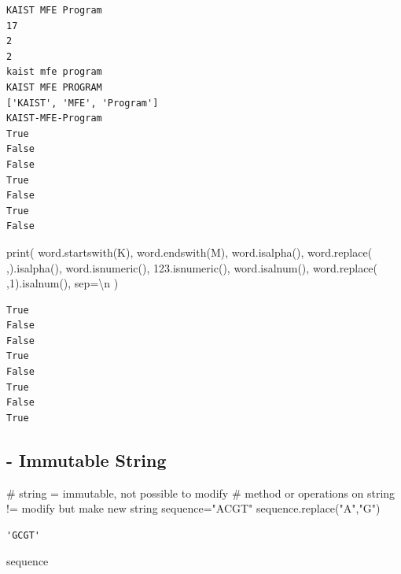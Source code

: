 \documentclass[
  a4paper,
  DIV=11,
  numbers=noendperiod]{scrreprt}
\newenvironment{Shaded}{\begin{snugshade}}{\end{snugshade}}
\newcommand{\BuiltInTok}[1]{\textcolor[rgb]{0.00,0.23,0.31}{#1}}
\newcommand{\CharTok}[1]{\textcolor[rgb]{0.13,0.47,0.30}{#1}}
\newcommand{\CommentTok}[1]{\textcolor[rgb]{0.37,0.37,0.37}{#1}}
\newcommand{\NormalTok}[1]{\textcolor[rgb]{0.00,0.23,0.31}{#1}}
\newcommand{\OperatorTok}[1]{\textcolor[rgb]{0.37,0.37,0.37}{#1}}
\newcommand{\StringTok}[1]{\textcolor[rgb]{0.13,0.47,0.30}{#1}}
\begin{document}
\begin{verbatim}
KAIST MFE Program
17
2
2
kaist mfe program
KAIST MFE PROGRAM
['KAIST', 'MFE', 'Program']
KAIST-MFE-Program
True
False
False
True
False
True
False
\end{verbatim}

\begin{Shaded}
\begin{Highlighting}[]
\BuiltInTok{print}\NormalTok{(}
\NormalTok{    word.startswith(}\StringTok{\textquotesingle{}K\textquotesingle{}}\NormalTok{),}
\NormalTok{    word.endswith(}\StringTok{\textquotesingle{}M\textquotesingle{}}\NormalTok{),}
\NormalTok{    word.isalpha(),}
\NormalTok{    word.replace(}\StringTok{\textquotesingle{} \textquotesingle{}}\NormalTok{,}\StringTok{\textquotesingle{}\textquotesingle{}}\NormalTok{).isalpha(),}
\NormalTok{    word.isnumeric(),}
    \StringTok{\textquotesingle{}123\textquotesingle{}}\NormalTok{.isnumeric(),}
\NormalTok{    word.isalnum(),}
\NormalTok{    word.replace(}\StringTok{\textquotesingle{} \textquotesingle{}}\NormalTok{,}\StringTok{\textquotesingle{}1\textquotesingle{}}\NormalTok{).isalnum(),}
\NormalTok{    sep}\OperatorTok{=}\StringTok{\textquotesingle{}}\CharTok{\textbackslash{}n}\StringTok{\textquotesingle{}}
\NormalTok{)}
\end{Highlighting}
\end{Shaded}

\begin{verbatim}
True
False
False
True
False
True
False
True
\end{verbatim}

\subsection{- Immutable String}\label{immutable-string}

\begin{Shaded}
\begin{Highlighting}[]
\CommentTok{\# string = immutable, not possible to modify}
\CommentTok{\# method or operations on string != modify but make new string}
\NormalTok{sequence}\OperatorTok{=}\StringTok{"ACGT"}
\NormalTok{sequence.replace(}\StringTok{"A"}\NormalTok{,}\StringTok{"G"}\NormalTok{)}
\end{Highlighting}
\end{Shaded}

\begin{verbatim}
'GCGT'
\end{verbatim}

\begin{Shaded}
\begin{Highlighting}[]
\NormalTok{sequence}
\end{Highlighting}
\end{Shaded}
\end{document}
